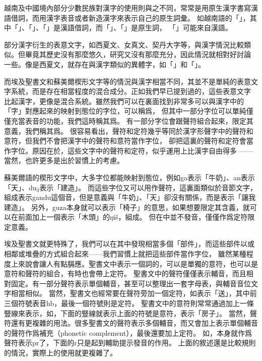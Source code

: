 越南及中國境內部分少數民族對漢字的使用則與之不同，常常是用原生漢字書寫漢語借詞，而用漢字表音或者新造漢字來表示自己的原生詞彙。
如越南語的「」，其中「」、「」、「」是漢語借詞，而「」、「」是原生詞，
「」可能來自漢語。

部分漢字衍生的表意文字，如西夏文、女真文、契丹大字等，與漢字情況比較類似。但畢竟其歷史沒有那麼悠久，研究又沒有那麼充分，因此情況就相對好討論
一些。像是西夏文，就存在與漢字類似的異體字，如「」和「」。

而埃及聖書文和蘇美爾楔形文字等的情況與漢字相當不同，其並不是單純的表意文字系統，而是存在相當程度的混合成分。正如我們早已提到過的，這些表意文字
比起漢字，更像是混合系統。雖然我們可以在裏面找到非常多可以與漢字中的「字」對應起來的映射到態位的字位，可以稱爲，
但其中一部分字位可以單純僅僅充當表音的功能，我們這時稱其爲。
有一部分字位會跟聲符組合起來，限定其意義，我們稱其爲。
很容易看出，聲符和定符幾乎等同於漢字形聲字中的聲符和意符，但我們不會把漢字中的聲符和意符當作字位，
卻把這裏的聲符和定符會當作字位。原因在於，這些文字中的聲符和定符，似乎運用上比漢字自由得多
——當然，也許更多是出於習慣上的考慮。

蘇美爾語的楔形文字中，大多字位都能映射到態位，例如ga表示「牛奶」、an表示「天」、du$_3$表示「建造」。
而這些字位又可以用作聲符，這裏面類似於音節文字，組成表示gandu這個音，但是意義與「牛奶」、「天」卻沒有關係，而是表示「讓我建造」。
另外，guza本身就可以表示「椅子」的意思，如果想要限定其含義，就可以在前面加上一個表示「木頭」的ŋiš，組成。
但在中並不發音，僅僅作爲定符限定意義。

埃及聖書文就更特殊了，我們可以在其中發現相當多個「部件」，而這些部件以或相鄰或堆疊的方式組合起來——我們習慣上就把這些部件當作字位，
雖然某種程度上來說會讓人有點膈應。聖書文中表示一個詞的，可以是單獨的意符，也可以是意符和聲符的組合，有時也會帶上定符。
聖書文中的聲符僅僅表示輔音，而且相對固定。有一部分聲符表示單個輔音，甚至可以整理出一套字母表，與輔音音位文字相當相似。
當然，聖書文也經常要在聲符旁加一個定符，如表示「送」，其中前三個符號表音hb，最後一個符號則是定符。
聖書文中的意符則常常通過加上一條豎線來表示，如，下面的豎線就表示上面的符號是意符，表示「房子」。
當然，聲符還有更複雜的用法。很多聖書文的聲符表示多個輔音，而又會加上表示單個輔音的聲符作爲補充（phonetic complement），最後還要加上定符。
如，本身就作爲聲符表示pr了，下面的r只是起到輔助提示發音的作用。
上面的敘述還是比較規則的情況，實際上的使用就更複雜了。

